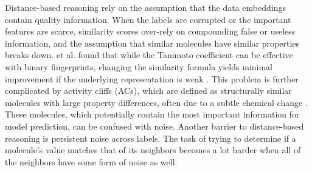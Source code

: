 
Distance-based reasoning rely on the assumption that the data embeddings  contain quality information. When the labels are corrupted or the important features are scarce, similarity scores over-rely on compounding false or useless information, and the assumption that similar molecules have similar properties breaks down. \citet{Bajusz2015} et al. found that while the Tanimoto coefficient can be effective with binary fingerprints, changing the similarity formula yields minimal improvement if the underlying representation is weak \citep{Bajusz2015}.
This problem is further complicated by activity cliffs (ACs), which are defined as structurally similar molecules with large property differences, often due to a subtle chemical change \citep{Stumpfe2012, Dablander2023}. These molecules, which potentially contain the most important information for model prediction, can be confused with noise. Another barrier to distance-based reasoning is persistent noise across labels. The task of trying to determine if a molecule's value matches that of its neighbors becomes a lot harder when all of the neighbors have some form of noise as well. 


